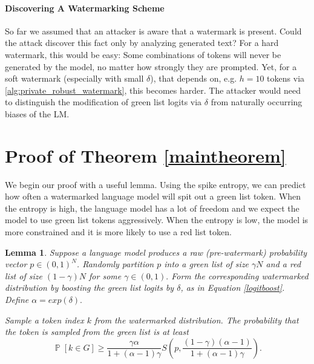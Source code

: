 \documentclass{article}
\theoremstyle{plain}
\newtheorem{lemma}[theorem]{Lemma}
\theoremstyle{definition}
\theoremstyle{remark}
\DeclareMathOperator*{\prob}{\mathbb{P}}
\begin{document}
\paragraph{Discovering A Watermarking Scheme}
So far we assumed that an attacker is aware that a watermark is present. Could the attack discover this fact only by analyzing generated text? For a hard watermark, this would be easy: Some combinations of tokens will never be generated by the model, no matter how strongly they are prompted. Yet, for a soft watermark (especially with small $\delta$), that depends on, e.g. $h=10$ tokens via \cref{alg:private_robust_watermark}, this becomes harder. The attacker would need to distinguish the modification of green list logits via $\delta$ from naturally occurring biases of the LM. 

\section{Proof of Theorem \ref{maintheorem}}
We begin our proof with a useful lemma.
Using the spike entropy, we can predict how often a watermarked language model will spit out a green list token.  When the entropy is high, the language model has a lot of freedom and we expect the model to use green list tokens aggressively.  When the entropy is low, the model is more constrained and it is more likely to use a red list token.   

\begin{lemma} \label{tokenlemma}
Suppose a language model produces a raw (pre-watermark) probability vector $p\in (0,1)^N$.  Randomly partition $p$ into a green list of size $\gamma N$ and a red list of size $(1-\gamma) N$ for some $\gamma\in (0,1).$ Form the corresponding watermarked distribution by boosting the green list logits by $\delta$, as in Equation \eqref{logitboost}. Define $\alpha=exp(\delta).$ 

Sample a token index $k$ from the watermarked distribution.  The probability that the token is sampled from the green list is at least
$$ \prob[k\in G] \ge  \frac{\gamma\alpha}{ 1+(\alpha-1)\gamma} S\left(p,\frac{(1-\gamma)(\alpha - 1)}{ 1+(\alpha-1)\gamma}\right).$$
\end{lemma}
\end{document}
